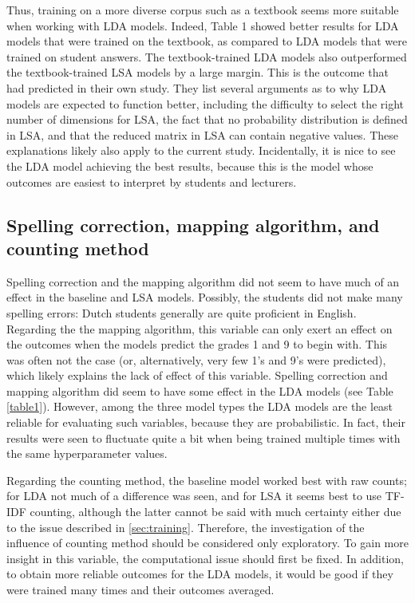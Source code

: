 \documentclass[a4paper,10pt,twoside]{article}
\begin{document}
Thus, training on a more diverse corpus such as a textbook seems more suitable when working with LDA models. Indeed, Table 1 showed better results for LDA models that were trained on the textbook, as compared to LDA models that were trained on student answers. The textbook-trained LDA models also outperformed the textbook-trained LSA models by a large margin. This is the outcome that  had predicted in their own study. They list several arguments as to why LDA models are expected to function better, including the difficulty to select the right number of dimensions for LSA, the fact that no probability distribution is defined in LSA, and that the reduced matrix in LSA can contain negative values. These explanations likely also apply to the current study. Incidentally, it is nice to see the LDA model achieving the best results, because this is the model whose outcomes are easiest to interpret by students and lecturers.

\subsection{Spelling correction, mapping algorithm, and counting method}
Spelling correction and the mapping algorithm did not seem to have much of an effect in the baseline and LSA models. Possibly, the students did not make many spelling errors: Dutch students generally are quite proficient in English. Regarding the the mapping algorithm, this variable can only exert an effect on the outcomes when the models predict the grades 1 and 9 to begin with. This was often not the case (or, alternatively, very few 1's and 9's were predicted), which likely explains the lack of effect of this variable. Spelling correction and mapping algorithm did seem to have some effect in the LDA models (see Table \ref{table1}). However, among the three model types the LDA models are the least reliable for evaluating such variables, because they are probabilistic. In fact, their results were seen to fluctuate quite a bit when being trained multiple times with the same hyperparameter values.

Regarding the counting method, the baseline model worked best with raw counts; for LDA not much of a difference was seen, and for LSA it seems best to use TF-IDF counting, although the latter cannot be said with much certainty either due to the issue described in \ref{sec:training}. Therefore, the investigation of the influence of counting method should be considered only exploratory. To gain more insight in this variable, the computational issue should first be fixed. In addition, to obtain more reliable outcomes for the LDA models, it would be good if they were trained many times and their outcomes averaged. 
\end{document}

